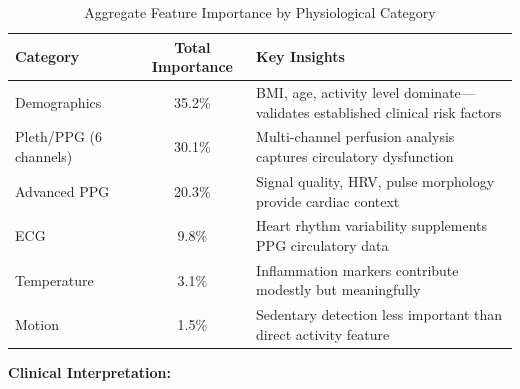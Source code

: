 \documentclass[3p,times,procedia]{elsarticle}
\begin{document}
\begin{table}[!ht]
\centering
\caption{Aggregate Feature Importance by Physiological Category}
\small
\begin{tabular}{|l|c|l|}
\hline
\rowcolor{gray!20}
\textbf{Category} & \textbf{Total Importance} & \textbf{Key Insights} \\
\hline
Demographics & 35.2\% & BMI, age, activity level dominate—validates established clinical risk factors \\
\rowcolor{gray!10}
Pleth/PPG (6 channels) & 30.1\% & Multi-channel perfusion analysis captures circulatory dysfunction \\
Advanced PPG & 20.3\% & Signal quality, HRV, pulse morphology provide cardiac context \\
\rowcolor{gray!10}
ECG & 9.8\% & Heart rhythm variability supplements PPG circulatory data \\
Temperature & 3.1\% & Inflammation markers contribute modestly but meaningfully \\
\rowcolor{gray!10}
Motion & 1.5\% & Sedentary detection less important than direct activity feature \\
\hline
\end{tabular}
\end{table}


\textbf{Clinical Interpretation:}
\end{document}
